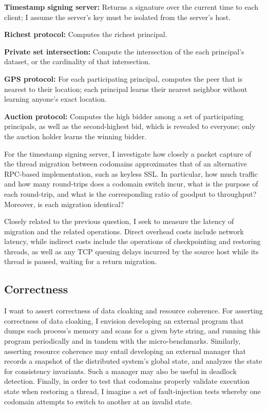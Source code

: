 \begin{widelist}
\item \textbf{Timestamp signing server:} Returns a signature over the current
time to each client; I assume the server's key must be isolated from the
server's host.
%
\item \textbf{Richest protocol:} Computes the richest principal.
%
\item \textbf{Private set intersection:} Compute the intersection of the each
    principal's dataset, or the cardinality of that intersection.
\item \textbf{GPS protocol:} For each participating principal,
computes the peer that is nearest to their location; each principal learns
their nearest neighbor without learning anyone's exact location.
%
\item \textbf{Auction protocol:} Computes the high bidder among a set of
participating principals, as well as the second-highest bid, which is revealed
to everyone; only the auction holder learns the winning bidder.
\end{widelist}

For the timestamp signing server, I investigate how closely a
packet capture of the thread migration between codomains approximates
that of an alternative RPC-based implementation, such as keyless SSL\@.
%
In particular, how much traffic and how many round-trips does a codomain switch
incur, what is the purpose of each round-trip, and what is the corresponding
ratio of goodput to throughput?
%
Moreover, is each migration identical?


Closely related to the previous question, I seek to measure the latency of
migration and the related operations.
%
Direct overhead costs include network latency, while indirect costs include the
operations of checkpointing and restoring threads, as well as any TCP queuing
delays incurred by the source host while its thread is paused, waiting for
a return migration.


\subsection{Correctness}

I want to assert correctness of data cloaking and resource coherence.
%
For asserting correctness of data cloaking, I envision developing an external
program that dumps each process's memory and scans for a given byte string,
and running this program periodically and in tandem with the micro-benchmarks.
%
Similarly, asserting resource coherence may entail developing an external
manager that records a snapshot of the distributed system's global state, and
analyzes the state for consistency invariants.
%
Such a manager may also be useful in deadlock detection.
%
Finally, in order to test that codomains properly validate execution state when
restoring a thread, I imagine a set of fault-injection tests whereby one
codomain attempts to switch to another at an invalid state.
